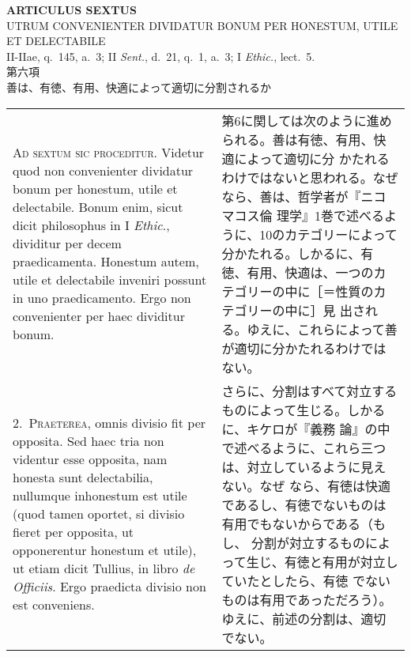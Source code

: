 \documentclass[10pt]{jsarticle}
\begin{document}
\newpage
{}

\begin{center}
 {\Large {\bf ARTICULUS SEXTUS}}\\
 {\large UTRUM CONVENIENTER DIVIDATUR BONUM PER HONESTUM, UTILE ET DELECTABILE}\\
 {\footnotesize II-IIae, q.~145, a.~3; II {\itshape Sent.}, d.~21, q.~1,
 a.~3; I {\itshape Ethic.}, lect.~5.}\\
 {\Large 第六項\\善は、有徳、有用、快適によって適切に分割されるか}
\end{center}

\begin{longtable}{p{21em}p{21em}}


{\huge A}{\scshape d sextum sic proceditur}. Videtur quod non
 convenienter dividatur bonum per honestum, utile et delectabile. Bonum
 enim, sicut dicit philosophus in I {\itshape Ethic}., dividitur per decem
 praedicamenta. Honestum autem, utile et delectabile inveniri possunt in
 uno praedicamento. Ergo non convenienter per haec dividitur bonum.

&


第6に関しては次のように進められる。善は有徳、有用、快適によって適切に分
 かたれるわけではないと思われる。なぜなら、善は、哲学者が『ニコマコス倫
 理学』1巻で述べるように、10のカテゴリーによって分かたれる。しかるに、有
 徳、有用、快適は、一つのカテゴリーの中に［＝性質のカテゴリーの中に］見
 出される。ゆえに、これらによって善が適切に分かたれるわけではない。

\\


2.~{\scshape Praeterea}, omnis divisio fit per opposita. Sed haec tria non
 videntur esse opposita, nam honesta sunt delectabilia, nullumque
 inhonestum est utile (quod tamen oportet, si divisio fieret per
 opposita, ut opponerentur honestum et utile), ut etiam dicit Tullius,
 in libro {\itshape de Officiis}. Ergo praedicta divisio non est conveniens.

&


さらに、分割はすべて対立するものによって生じる。しかるに、キケロが『義務
 論』の中で述べるように、これら三つは、対立しているように見えない。なぜ
 なら、有徳は快適であるし、有徳でないものは有用でもないからである（もし、
 分割が対立するものによって生じ、有徳と有用が対立していたとしたら、有徳
 でないものは有用であっただろう）。ゆえに、前述の分割は、適切でない。

\\



\end{longtable}
\end{document}
